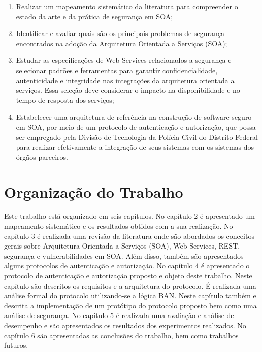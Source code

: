 \begin{enumerate}[a )]
	\item Realizar um mapeamento sistemático da literatura para compreender o estado da arte e da prática de segurança em SOA;

	\item Identificar e avaliar quais são os principais problemas de segurança encontrados na adoção da Arquitetura Orientada a Serviços (SOA);

	\item Estudar as especificações de Web Services relacionados a segurança e selecionar padrões e ferramentas para garantir confidencialidade, autenticidade e integridade nas integrações da arquitetura orientada a serviços. Essa seleção deve considerar o impacto na disponibilidade e no tempo de resposta dos serviços;

    \item Estabelecer uma arquitetura de referência na construção de software seguro em  SOA, por meio de um protocolo de autenticação e autorização, que possa ser empregado pela Divisão de Tecnologia da Polícia Civil do Distrito Federal para realizar efetivamente a integração de seus sistemas com os sistemas dos órgãos parceiros.

\end{enumerate}

\section{Organização do Trabalho}

Este trabalho está organizado em seis capítulos. No capítulo 2 é apresentado um mapeamento sistemático e os resultados obtidos com a sua realização. No capítulo 3 é realizada uma revisão da literatura onde são abordados os conceitos gerais sobre Arquitetura Orientada a Serviços (SOA), Web Services, REST, segurança e vulnerabilidades em SOA. Além disso, também são apresentados alguns protocolos de autenticação e autorização. No capítulo 4 é apresentado o protocolo de autenticação e autorização proposto e objeto deste trabalho. Neste capítulo são descritos os requisitos e a arquitetura do protocolo. É realizada uma análise formal do protocolo utilizando-se a lógica BAN. Neste capítulo também e descrita a implementação de um protótipo do protocolo proposto bem como uma análise de segurança. No capítulo 5 é realizada uma avaliação e análise de desempenho e são apresentados os resultados dos experimentos realizados. No capítulo 6 são apresentadas as conclusões do trabalho, bem como trabalhos futuros. 
